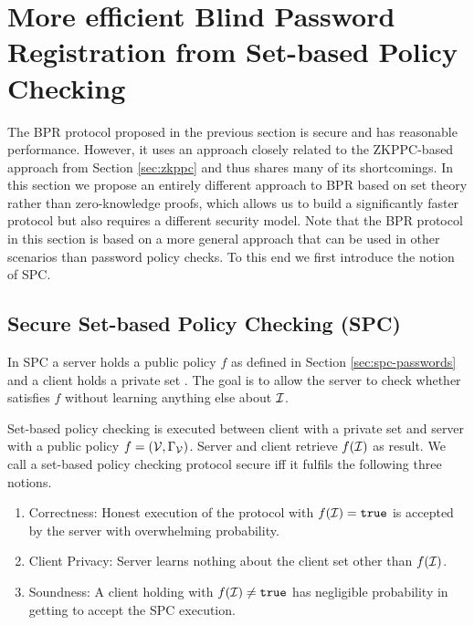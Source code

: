 \section[SPC-based Password Registration]{More efficient Blind Password Registration from Set-based Policy Checking}\label{sec:spc-bpr}

The \ac{BPR} protocol proposed in the previous section is secure and has reasonable performance.
However, it uses an approach closely related to the \ac{ZKPPC}-based approach from Section \ref{sec:zkppc} and thus shares many of its shortcomings.
In this section we propose an entirely different approach to \acl{BPR} based on set theory rather than zero-knowledge proofs, which allows us to build a significantly faster protocol but also requires a different security model.
Note that the \ac{BPR} protocol in this section is based on a more general approach that can be used in other scenarios than password policy checks.
To this end we first introduce the notion of \acl{SPC}.

\subsection{Secure Set-based Policy Checking (SPC)} \label{sec:spc}
In \ac{SPC} a server holds a public policy $f$ as defined in Section \ref{sec:spc-passwords} and a client holds a private set \ClientSet. 
The goal is to allow the server to check whether \ClientSet satisfies $f$ without learning anything else about $\mathcal{I}$. 

\begin{definition}\label{def:SPC}
Set-based policy checking is executed between client \Client with a private set \ClientSet and server \Server with a public policy $f=(\mathcal{V},\Gamma_\mathcal{V})$.
Server and client retrieve $f(\mathcal{I})$ as result. 
We call a set-based policy checking protocol secure iff it fulfils the following three notions.
\begin{enumerate}
  \item Correctness: Honest execution of the protocol with $f(\mathcal{I})=\mathtt{true}$ is accepted by the server with overwhelming probability.
  \item Client Privacy: Server \Server learns nothing about the client set \ClientSet other than $f(\mathcal{I})$.
  \item Soundness: A client \Client holding \ClientSet with $f(\mathcal{I})\not=\mathtt{true}$ has negligible probability in getting \Server to accept the \ac{SPC} execution. \eod
\end{enumerate}
\end{definition}


